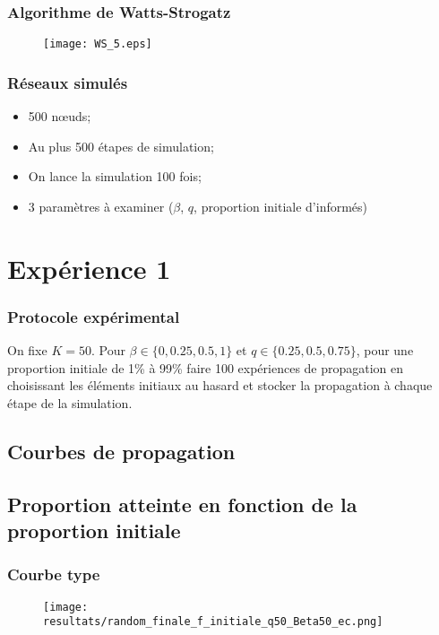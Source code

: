 \documentclass{beamer}
\begin{document}
\begin{frame}
  \frametitle{Algorithme de Watts-Strogatz}
  \begin{figure}[H]
    \texttt{[image: WS\_5.eps]}
  \end{figure}
\end{frame}

\begin{frame}
  \frametitle{Réseaux simulés}
  \begin{itemize}
    \item<1-> 500 nœuds;
    \item<2-> Au plus 500 étapes de simulation;
    \item<3-> On lance la simulation 100 fois;
    \item<4-> 3 paramètres à examiner ($\beta$, $q$, proportion initiale d'informés)
  \end{itemize}
\end{frame}

\section{Expérience 1}
\begin{frame}
  \frametitle{Protocole expérimental}
  On fixe $K=50$.
  Pour $\beta \in \{0,0.25,0.5,1\}$ et $q\in \{0.25, 0.5, 0.75\}$, pour une proportion initiale de 1\% à 99\% faire 100 expériences de propagation en choisissant les éléments initiaux au hasard et stocker la propagation à chaque étape de la simulation.

\end{frame}

\subsection{Courbes de propagation}

\subsection{Proportion atteinte en fonction de la proportion initiale}
\begin{frame}
  \frametitle{Courbe type}
  \begin{figure}[H]
  \begin{center}
    \texttt{[image: resultats/random\_finale\_f\_initiale\_q50\_Beta50\_ec.png]}
  \end{center}
  \end{figure}
\end{frame}
\end{document}
